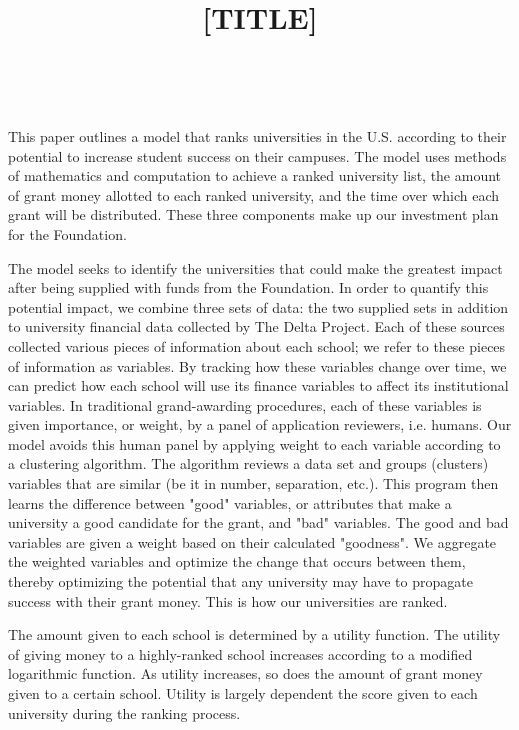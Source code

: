 \documentclass[11pt, reqno]{amsart}
\title{[TITLE]}
\begin{document}
	\nocite{*}
	\thispagestyle{empty}
	
	\ \vspace{8.6cm}
	
		This paper outlines a model that ranks universities in the U.S. according to their potential to increase student success on their campuses. The model uses methods of mathematics and computation to achieve a ranked university list, the amount of grant money allotted to each ranked university, and the time over which each grant will be distributed. These three components make up our investment plan for the Foundation.
		
		The model seeks to identify the universities that could make the greatest impact after being supplied with funds from the Foundation. In order to quantify this potential impact, we combine three sets of data: the two supplied sets in addition to university financial data collected by The Delta Project. Each of these sources collected various pieces of information about each school; we refer to these pieces of information as variables. By tracking how these variables change over time, we can predict how each school will use its finance variables to affect its institutional variables. In traditional grand-awarding procedures, each of these variables is given importance, or weight, by a panel of application reviewers, i.e. humans. Our model avoids this human panel by applying weight to each variable according to a clustering algorithm. The algorithm reviews a data set and groups (clusters) variables that are similar (be it in number, separation, etc.). This program then learns the difference between "good" variables, or attributes that make a university a good candidate for the grant, and "bad" variables. The good and bad variables are given a weight based on their calculated "goodness". We aggregate the weighted variables and optimize the change that occurs between them, thereby optimizing the potential that any university may have to propagate success with their grant money. This is how our universities are ranked.
		     
		The amount given to each school is determined by a utility function. The utility of giving money to a highly-ranked school increases according to a modified logarithmic function. As utility increases, so does the amount of grant money given to a certain school. Utility is largely dependent the score given to each university during the ranking process. 
		     
\end{document}
